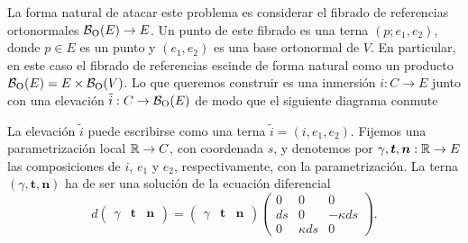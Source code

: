 \documentclass[11pt,a4paper]{amsbook}
\theoremstyle{remark} \newtheorem{rmk}[subsection]{Observación}
\theoremstyle{definition} \newtheorem{defn}[subsection]{Definición}
\theoremstyle{definition} \newtheorem{ex}[subsection]{Ejemplo}
\theoremstyle{definition} \newtheorem{ej}[subsection]{Ejercicio}
\begin{document}
La forma natural de atacar este problema es considerar el fibrado de referencias ortonormales $\mathcal B_{\mathrm{O}}(E)\rightarrow E$. Un punto de este fibrado es una terna $(p;e_1,e_2)$, donde $p\in E$ es un punto y $(e_1,e_2)$ es una base ortonormal de $V$. En particular, en este caso el fibrado de referencias escinde de forma natural como un producto $\mathcal B_{\mathrm{O}}(E)=E\times \mathcal B_{\mathrm{O}}(V)$.
Lo que queremos construir es una inmersión $i:C\rightarrow E$ junto con una elevación $\tilde{i}:C\rightarrow \mathcal B_{\mathrm{O}}(E)$ de modo que el siguiente diagrama conmute
\begin{center}
\end{center}
La elevación $\tilde{i}$ puede escribirse como una terna $\tilde{i}=(i,e_1,e_2)$. Fijemos una parametrización local $\mathbb R \rightarrow C$, con coordenada $s$, y denotemos por $\gamma,\bm{t},\bm{n}:\mathbb R\rightarrow E$ las composiciones de $i$, $e_1$ y $e_2$, respectivamente, con la parametrización. La terna $(\gamma,\bm{t},\bm{n})$ ha de ser una solución de la ecuación diferencial
\begin{equation*}
d\begin{pmatrix}
\gamma & \bm{t} & \bm{n}
\end{pmatrix} = \begin{pmatrix}
\gamma & \bm{t} & \bm{n}
\end{pmatrix}
\begin{pmatrix}
  0 & 0 & 0 \\
  ds & 0 & -\kappa ds \\
  0 & \kappa ds & 0
\end{pmatrix}.
\end{equation*}
\end{document}
